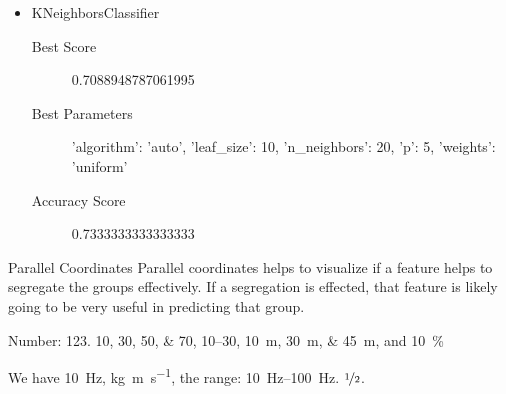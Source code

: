 \begin{itemize}
	\item KNeighborsClassifier
	
	\begin{description}
		\item[Best Score] 0.7088948787061995
		\item[Best Parameters] 'algorithm': 'auto', 'leaf_size': 10, 'n_neighbors': 20, 'p': 5, 'weights': 'uniform'
		\item[Accuracy Score] 0.7333333333333333
	\end{description}
\end{itemize}
 







Parallel Coordinates 
Parallel coordinates helps to visualize if a feature helps to segregate the groups effectively. If a segregation is effected, that feature is likely going to be very useful in predicting that group.


Number:
\num{123}.
\numlist{10;30;50;70},
\numrange{10}{30},
\SIlist{10;30;45}{\metre},
and
\SI{10}{\percent}



\begin{ConferenceOnly}
We have \SI{10}{\hertz},
\si{\kilogram\metre\per\second},
the range: \SIrange{10}{100}{\hertz}.
$\nicefrac[]{1}{2}$.


\end{ConferenceOnly}


